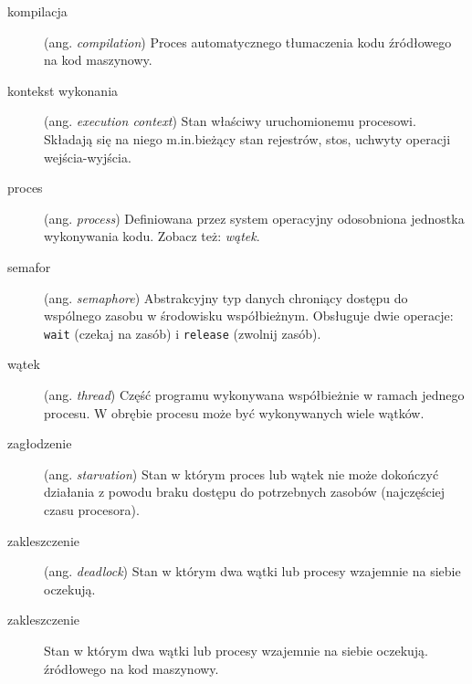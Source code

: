 \documentclass[12pt]{article}
\begin{document}
\begin{description}
    \item[kompilacja] (ang. \emph{compilation}) Proces automatycznego tłumaczenia kodu źródłowego na kod maszynowy.
    \item[kontekst wykonania] (ang. \emph{execution context}) Stan właściwy uruchomionemu procesowi. Składają się na niego m.in.bieżący stan rejestrów, stos, uchwyty operacji wejścia-wyjścia.
    \item[proces] (ang. \emph{process}) Definiowana przez system operacyjny odosobniona jednostka wykonywania kodu. Zobacz też: \emph{wątek}.
    \item[semafor] (ang. \emph{semaphore}) Abstrakcyjny typ danych chroniący dostępu do wspólnego zasobu w środowisku współbieżnym. Obsługuje dwie operacje: \texttt{wait} (czekaj na zasób) i \texttt{release} (zwolnij zasób).
    \item[wątek] (ang. \emph{thread}) Część programu wykonywana współbieżnie w ramach jednego procesu. W obrębie procesu może być wykonywanych wiele wątków.
    \item[zagłodzenie] (ang. \emph{starvation}) Stan w którym proces lub wątek nie może dokończyć działania z powodu braku dostępu do potrzebnych zasobów (najczęściej czasu procesora).
    \item[zakleszczenie] (ang. \emph{deadlock}) Stan w którym dwa wątki lub procesy wzajemnie na siebie oczekują.
    \item[zakleszczenie] Stan w którym dwa wątki lub procesy wzajemnie na siebie oczekują.
    źródłowego na kod maszynowy.
\end{description}
\end{document}
